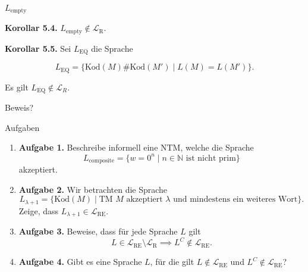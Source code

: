 \documentclass[11pt,aspectratio=169]{beamer}
\begin{document}
\begin{frame}{\(L_{\text{empty}}\)}

    \justifying

    \textbf{Korollar 5.4.} \(L_{\text{empty}} \not\in \mathcal L_{\text{R}}\).

    \vspace{1em}

    \textbf{Korollar 5.5.} Sei \(L_{\text{EQ}}\) die Sprache

    \[
        L_{\text{EQ}} = \{\text{Kod}(M)\#\text{Kod}(M') \mid L(M) = L(M')\}.
    \]

    Es gilt \(L_{\text{EQ}} \not\in \mathcal L_{R}\).

    \vspace{1em}

    Beweis?
\end{frame}


\begin{frame}{Aufgaben}
    \begin{enumerate}
        \justifying
        \item
            \textbf{Aufgabe 1.}
            Beschreibe informell eine NTM, welche die Sprache
            \[
                L_{\text{composite}} = \{ w = 0^n \mid n \in \mathbb N \text{ ist nicht prim}\}
            \]
            akzeptiert.
        \item
            \textbf{Aufgabe 2.}
            Wir betrachten die Sprache
            \[
                L_{\lambda + 1} = \{\text{Kod}(M) \mid \text{TM } M \text{ akzeptiert } \lambda \text{ und mindestens ein weiteres Wort}\}.
            \]
            Zeige, dass \(L_{\lambda + 1} \in \mathcal L_{\text{RE}}\).
        \item
            \textbf{Aufgabe 3.}
            Beweise, dass für jede Sprache \(L\) gilt
            \[
                L \in \mathcal L_{\text{RE}} \setminus \mathcal L_{\text{R}} \implies L^C \not\in \mathcal L_{\text{RE}}.
            \]
        \item
            \textbf{Aufgabe 4.}
            Gibt es eine Sprache \(L\), für die gilt
            \(L \not\in \mathcal L_{\text{RE}}\) und
            \(L^C \not\in \mathcal L_{\text{RE}}\)?

    \end{enumerate}
\end{frame}
\end{document}
